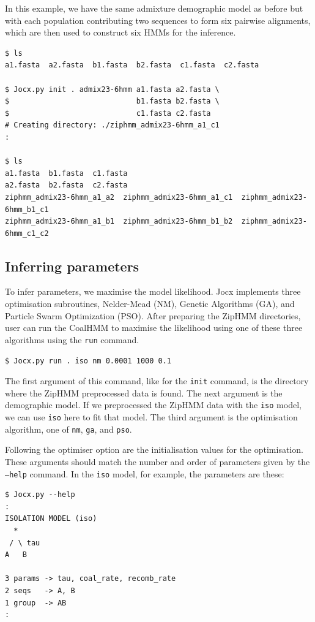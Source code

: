 \documentclass[graybox]{svmult}
\begin{document}
In this example, we have the same admixture demographic model as before but with each population contributing two sequences to form six pairwise alignments, which are then used to construct six HMMs for the inference.

 {\scriptsize{}\begin{verbatim}
$ ls
a1.fasta  a2.fasta  b1.fasta  b2.fasta  c1.fasta  c2.fasta

$ Jocx.py init . admix23-6hmm a1.fasta a2.fasta \
$                             b1.fasta b2.fasta \
$                             c1.fasta c2.fasta
# Creating directory: ./ziphmm_admix23-6hmm_a1_c1
:

$ ls
a1.fasta  b1.fasta  c1.fasta
a2.fasta  b2.fasta  c2.fasta
ziphmm_admix23-6hmm_a1_a2  ziphmm_admix23-6hmm_a1_c1  ziphmm_admix23-6hmm_b1_c1
ziphmm_admix23-6hmm_a1_b1  ziphmm_admix23-6hmm_b1_b2  ziphmm_admix23-6hmm_c1_c2
\end{verbatim}}

\subsection{Inferring parameters}

To infer parameters, we maximise the model likelihood. Jocx implements three optimisation subroutines, Nelder-Mead (NM), Genetic Algorithms (GA), and Particle Swarm Optimization (PSO). After preparing the ZipHMM directories, user can run the CoalHMM to maximise the likelihood using one of these three algorithms using the \texttt{run} command.

 {\scriptsize{}\begin{verbatim}
$ Jocx.py run . iso nm 0.0001 1000 0.1
\end{verbatim}}

The first argument of this command, like for the \texttt{init} command, is the directory where the ZipHMM preprocessed data is found. The next argument is the demographic model. If we preprocessed the ZipHMM data with the \texttt{iso} model, we can use \texttt{iso} here to fit that model. The third argument is the optimisation algorithm, one of \texttt{nm}, \texttt{ga}, and \texttt{pso}.

Following the optimiser option are the initialisation values for the optimisation. These arguments should match the number and order of parameters given by the \texttt{--help} command. In the \texttt{iso} model, for example, the parameters are these:

 {\scriptsize{}\begin{verbatim}
$ Jocx.py --help
:
ISOLATION MODEL (iso)
  *
 / \ tau
A   B

3 params -> tau, coal_rate, recomb_rate
2 seqs   -> A, B
1 group  -> AB
:
\end{verbatim}}
\end{document}
